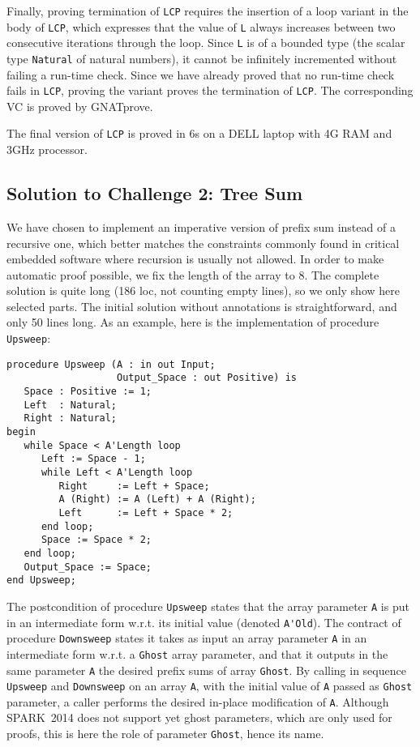 \documentclass[sttt,draft]{svjour}
\newcommand{\gnatprove}{GNATprove\xspace}
\newcommand{\newspark}{SPARK~2014\xspace}
\newcommand{\wrt}{w.r.t.\xspace}
\begin{document}
Finally, proving termination of \verb|LCP| requires the insertion of a loop
variant in the body of \verb|LCP|, which expresses that the value of \verb|L|
always increases between two consecutive iterations through the loop. Since
\verb|L| is of a bounded type (the scalar type \verb|Natural| of natural
numbers), it cannot be infinitely incremented without failing a run-time
check. Since we have already proved that no run-time check fails in \verb|LCP|,
proving the variant proves the termination of \verb|LCP|. The corresponding VC
is proved by \gnatprove.

The final version of \verb|LCP| is proved in 6s on a DELL laptop with 4G RAM
and 3GHz processor.

\subsection{Solution to Challenge 2: Tree Sum}

We have chosen to implement an imperative version of prefix sum instead of a
recursive one, which better matches the constraints commonly found in critical
embedded software where recursion is usually not allowed. In order to make
automatic proof possible, we fix the length of the array to 8. The complete
solution is quite long (186 loc, not counting empty lines), so we only show
here selected parts. The initial solution without annotations is
straightforward, and only 50 lines long. As an example, here is the
implementation of procedure \verb|Upsweep|:

\begin{footnotesize}
\begin{verbatim}
procedure Upsweep (A : in out Input;
                   Output_Space : out Positive) is
   Space : Positive := 1;
   Left  : Natural;
   Right : Natural;
begin
   while Space < A'Length loop
      Left := Space - 1;
      while Left < A'Length loop
         Right     := Left + Space;
         A (Right) := A (Left) + A (Right);
         Left      := Left + Space * 2;
      end loop;
      Space := Space * 2;
   end loop;
   Output_Space := Space;
end Upsweep;
\end{verbatim}
\end{footnotesize}

The postcondition of procedure \verb|Upsweep| states that the array parameter
\verb|A| is put in an intermediate form \wrt its initial value (denoted
\verb|A'Old|). The contract of procedure \verb|Downsweep| states it takes as
input an array parameter \verb|A| in an intermediate form \wrt a \verb|Ghost|
array parameter, and that it outputs in the same parameter \verb|A| the desired
prefix sums of array \verb|Ghost|. By calling in sequence \verb|Upsweep| and
\verb|Downsweep| on an array \verb|A|, with the initial value of \verb|A|
passed as \verb|Ghost| parameter, a caller performs the desired in-place
modification of \verb|A|. Although \newspark does not support yet ghost
parameters, which are only used for proofs, this is here the role of parameter
\verb|Ghost|, hence its name.
\end{document}
